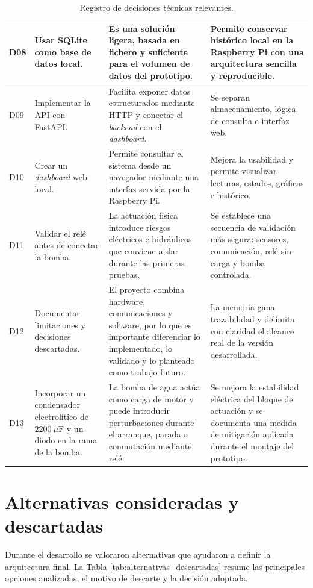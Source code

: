 \begin{table}[H]
\begin{tabular}{|p{}|p{}|p{}|p{}|}
\hline
D08 & Usar SQLite como base de datos local. & Es una solución ligera, basada en fichero y suficiente para el volumen de datos del prototipo. & Permite conservar histórico local en la Raspberry Pi con una arquitectura sencilla y reproducible. \\
\hline
D09 & Implementar la API con FastAPI. & Facilita exponer datos estructurados mediante HTTP y conectar el \textit{backend} con el \textit{dashboard}. & Se separan almacenamiento, lógica de consulta e interfaz web. \\
\hline
D10 & Crear un \textit{dashboard} web local. & Permite consultar el sistema desde un navegador mediante una interfaz servida por la Raspberry Pi. & Mejora la usabilidad y permite visualizar lecturas, estados, gráficas e histórico. \\
\hline
D11 & Validar el relé antes de conectar la bomba. & La actuación física introduce riesgos eléctricos e hidráulicos que conviene aislar durante las primeras pruebas. & Se establece una secuencia de validación más segura: sensores, comunicación, relé sin carga y bomba controlada. \\
\hline
D12 & Documentar limitaciones y decisiones descartadas. & El proyecto combina hardware, comunicaciones y software, por lo que es importante diferenciar lo implementado, lo validado y lo planteado como trabajo futuro. & La memoria gana trazabilidad y delimita con claridad el alcance real de la versión desarrollada. \\
\hline
D13 & Incorporar un condensador electrolítico de \(2200~\mu\mathrm{F}\) y un diodo en la rama de la bomba. & La bomba de agua actúa como carga de motor y puede introducir perturbaciones durante el arranque, parada o conmutación mediante relé. & Se mejora la estabilidad eléctrica del bloque de actuación y se documenta una medida de mitigación aplicada durante el montaje del prototipo. \\
\hline
\end{tabular}
\caption{Registro de decisiones técnicas relevantes.}
\label{tab:registro_decisiones_tecnicas}
\end{table}

\section{Alternativas consideradas y descartadas}

Durante el desarrollo se valoraron alternativas que ayudaron a definir la arquitectura final. La Tabla \ref{tab:alternativas_descartadas} resume las principales opciones analizadas, el motivo de descarte y la decisión adoptada.

